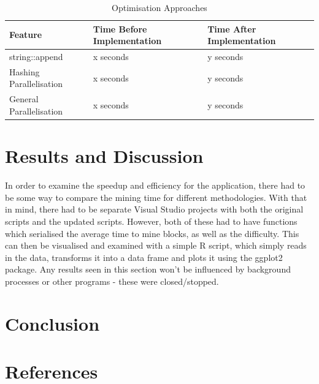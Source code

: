 \documentclass[12pt, a4paper]{article}
\begin{document}
\begin{table}[H]
    \centering
    \begin{tabular}{| l | l | l |}
    \hline
    Feature & Time Before Implementation & Time After Implementation \\ \hline
    string::append & x seconds & y seconds \\ \hline
    Hashing Parallelisation & x seconds & y seconds \\ \hline
    General Parallelisation & x seconds & y seconds \\ \hline
    \end{tabular}
    \caption{Optimisation Approaches}
\end{table}

\section{Results and Discussion}
In order to examine the speedup and efficiency for the application, there had to be some way to compare the mining time for different methodologies. With that in mind, there had to be separate Visual Studio projects with both the original scripts and the updated scripts. However, both of these had to have functions which serialised the average time to mine blocks, as well as the difficulty. This can then be visualised and examined with a simple R script, which simply reads in the data, transforms it into a data frame and plots it using the ggplot2 package. Any results seen in this section won't be influenced by background processes or other programs - these were closed/stopped. 

\section{Conclusion}

\section{References}
\end{document}
